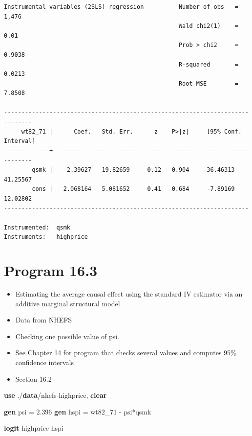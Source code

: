 \documentclass[
  10pt,
]{book}
\newenvironment{Shaded}{\begin{snugshade}}{\end{snugshade}}
\newcommand{\KeywordTok}[1]{\textcolor[rgb]{0.13,0.29,0.53}{\textbf{#1}}}
\newcommand{\NormalTok}[1]{#1}
\providecommand{\tightlist}{%
  \setlength{\itemsep}{0pt}\setlength{\parskip}{0pt}}
\begin{document}
\begin{verbatim}
Instrumental variables (2SLS) regression          Number of obs   =      1,476
                                                  Wald chi2(1)    =       0.01
                                                  Prob > chi2     =     0.9038
                                                  R-squared       =     0.0213
                                                  Root MSE        =     7.8508

------------------------------------------------------------------------------
     wt82_71 |      Coef.   Std. Err.      z    P>|z|     [95% Conf. Interval]
-------------+----------------------------------------------------------------
        qsmk |    2.39627   19.82659     0.12   0.904    -36.46313    41.25567
       _cons |   2.068164   5.081652     0.41   0.684     -7.89169    12.02802
------------------------------------------------------------------------------
Instrumented:  qsmk
Instruments:   highprice
\end{verbatim}

\hypertarget{program-16.3}{%
\section{Program 16.3}\label{program-16.3}}

\begin{itemize}
\tightlist
\item
  Estimating the average causal effect using the standard IV estimator via an additive marginal structural model
\item
  Data from NHEFS
\item
  Checking one possible value of psi.
\item
  See Chapter 14 for program that checks several values and computes 95\% confidence intervals\\
\item
  Section 16.2
\end{itemize}

\begin{Shaded}
\begin{Highlighting}[]
\KeywordTok{use}\NormalTok{ ./}\KeywordTok{data}\NormalTok{/nhefs-highprice, }\KeywordTok{clear}

\KeywordTok{gen}\NormalTok{ psi = 2.396}
\KeywordTok{gen}\NormalTok{ hspi = wt82_71 - psi*qsmk}

\KeywordTok{logit}\NormalTok{ highprice hspi}
\end{Highlighting}
\end{Shaded}
\end{document}
